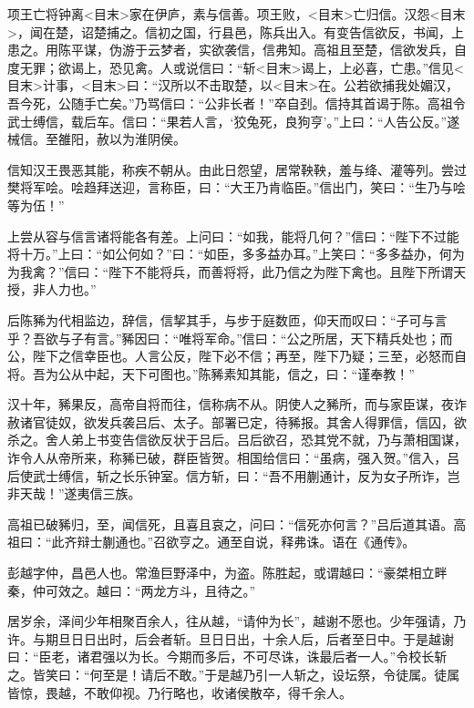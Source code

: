 \documentclass[]{article}
\begin{document}
项王亡将钟离\textless{}目末\textgreater{}家在伊庐，素与信善。项王败，\textless{}目末\textgreater{}亡归信。汉怨\textless{}目末\textgreater{}，闻在楚，诏楚捕之。信初之国，行县邑，陈兵出入。有变告信欲反，书闻，上患之。用陈平谋，伪游于云梦者，实欲袭信，信弗知。高祖且至楚，信欲发兵，自度无罪；欲谒上，恐见禽。人或说信曰：``斩\textless{}目末\textgreater{}谒上，上必喜，亡患。''信见\textless{}目末\textgreater{}计事，\textless{}目末\textgreater{}曰：``汉所以不击取楚，以\textless{}目末\textgreater{}在。公若欲捕我处媚汉，吾今死，公随手亡矣。''乃骂信曰：``公非长者！''卒自刭。信持其首谒于陈。高祖令武士缚信，载后车。信曰：``果若人言，`狡兔死，良狗亨'。''上曰：``人告公反。''遂械信。至雒阳，赦以为淮阴侯。

信知汉王畏恶其能，称疾不朝从。由此日怨望，居常鞅鞅，羞与绛、灌等列。尝过樊将军哙。哙趋拜送迎，言称臣，曰：``大王乃肯临臣。''信出门，笑曰：``生乃与哙等为伍！''

上尝从容与信言诸将能各有差。上问曰：``如我，能将几何？''信曰：``陛下不过能将十万。''上曰：``如公何如？''曰：``如臣，多多益办耳。''上笑曰：``多多益办，何为为我禽？''信曰：``陛下不能将兵，而善将将，此乃信之为陛下禽也。且陛下所谓天授，非人力也。''

后陈豨为代相监边，辞信，信挈其手，与步于庭数匝，仰天而叹曰：``子可与言乎？吾欲与子有言。''豨因曰：``唯将军命。''信曰：``公之所居，天下精兵处也；而公，陛下之信幸臣也。人言公反，陛下必不信；再至，陛下乃疑；三至，必怒而自将。吾为公从中起，天下可图也。''陈豨素知其能，信之，曰：``谨奉教！''

汉十年，豨果反，高帝自将而往，信称病不从。阴使人之豨所，而与家臣谋，夜诈赦诸官徒奴，欲发兵袭吕后、太子。部署已定，待豨报。其舍人得罪信，信囚，欲杀之。舍人弟上书变告信欲反状于吕后。吕后欲召，恐其党不就，乃与萧相国谋，诈令人从帝所来，称豨已破，群臣皆贺。相国给信曰：``虽病，强入贺。''信入，吕后使武士缚信，斩之长乐钟室。信方斩，曰：``吾不用蒯通计，反为女子所诈，岂非天哉！''遂夷信三族。

高祖已破豨归，至，闻信死，且喜且哀之，问曰：``信死亦何言？''吕后道其语。高祖曰：``此齐辩士蒯通也。''召欲亨之。通至自说，释弗诛。语在《通传》。

彭越字仲，昌邑人也。常渔巨野泽中，为盗。陈胜起，或谓越曰：``豪桀相立畔秦，仲可效之。越曰：``两龙方斗，且待之。''

居岁余，泽间少年相聚百余人，往从越，``请仲为长''，越谢不愿也。少年强请，乃许。与期旦日日出时，后会者斩。旦日日出，十余人后，后者至日中。于是越谢曰：``臣老，诸君强以为长。今期而多后，不可尽诛，诛最后者一人。''令校长斩之。皆笑曰：``何至是！请后不敢。''于是越乃引一人斩之，设坛祭，令徒属。徒属皆惊，畏越，不敢仰视。乃行略也，收诸侯散卒，得千余人。
\end{document}
